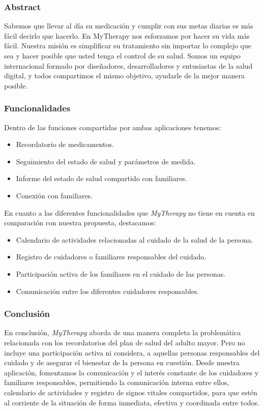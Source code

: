\documentclass[a4paper,12pt]{article}
\begin{document}
    \subsubsection{Abstract}
    Sabemos que llevar al día su medicación y cumplir con sus metas diarias es más fácil decirlo que hacerlo. En MyTherapy nos esforzamos por hacer su vida más fácil. Nuestra misión es simplificar su tratamiento sin importar lo complejo que sea y hacer posible que usted tenga el control de su salud. Somos un equipo internacional formado por diseñadores, desarrolladores y entusiastas de la salud digital, y todos compartimos el mismo objetivo, ayudarle de la mejor manera posible. \cite{MyTherapy}
    \subsubsection{Funcionalidades}
    Dentro de las funciones compartidas por ambas aplicaciones tenemos:
    \begin{itemize}
        \item Recordatorio de medicamentos.
        \item Seguimiento del estado de salud y parámetros de medida.
        \item Informe del estado de salud compartido con familiares.
        \item Conexión con familiares.
    \end{itemize}
    En cuanto a las diferentes funcionalidades que \textit{MyTherapy} no tiene en cuenta en comparación con nuestra propuesta, destacamos:
    \begin{itemize}
        \item Calendario de actividades relacionadas al cuidado de la salud de la persona.
        \item Registro de cuidadores o familiares responsables del cuidado.
        \item Participación activa de los familiares en el cuidado de las personas.
        \item Comunicación entre los diferentes cuidadores responsables.        
    \end{itemize}
    \subsubsection{Conclusión}
    En conclusión, \textit{MyTherapy} aborda de una manera completa la problemática relacionada con los recordatorios del plan de salud del adulto mayor. Pero no incluye una participación activa ni considera, a aquellas personas responsables del cuidado y de asegurar el bienestar de la persona en cuestión. Desde nuestra aplicación, fomentamos la comunicación y el interés constante de los cuidadores y familiares responsables, permitiendo la comunicación interna entre ellos, calendario de actividades y registro de signos vitales compartidos, para que estén al corriente de la situación de forma inmediata, efectiva y coordinada entre todos.
\end{document}
